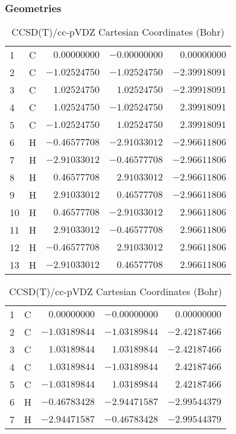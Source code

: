 \documentclass[10pt,oneside]{article}
\begin{document}
\begin{table}[h!]
\subsubsection*{Geometries}
\begin{multicols}{2}
\centering
\caption{CCSD(T)/cc-pVTZ Cartesian Coordinates (Bohr)}
\begin{tabular}{llrrr}
\toprule
1  & C  & $ 0.00000000$ & $-0.00000000$ & $ 0.00000000$ \\
2  & C  & $-1.02524750$ & $-1.02524750$ & $-2.39918091$ \\
3  & C  & $ 1.02524750$ & $ 1.02524750$ & $-2.39918091$ \\
4  & C  & $ 1.02524750$ & $-1.02524750$ & $ 2.39918091$ \\
5  & C  & $-1.02524750$ & $ 1.02524750$ & $ 2.39918091$ \\
6  & H  & $-0.46577708$ & $-2.91033012$ & $-2.96611806$ \\
7  & H  & $-2.91033012$ & $-0.46577708$ & $-2.96611806$ \\
8  & H  & $ 0.46577708$ & $ 2.91033012$ & $-2.96611806$ \\
9  & H  & $ 2.91033012$ & $ 0.46577708$ & $-2.96611806$ \\
10 & H  & $ 0.46577708$ & $-2.91033012$ & $ 2.96611806$ \\
11 & H  & $ 2.91033012$ & $-0.46577708$ & $ 2.96611806$ \\
12 & H  & $-0.46577708$ & $ 2.91033012$ & $ 2.96611806$ \\
13 & H  & $-2.91033012$ & $ 0.46577708$ & $ 2.96611806$ \\
\bottomrule
\end{tabular}
\caption{CCSD(T)/cc-pVDZ Cartesian Coordinates (Bohr)}
\begin{tabular}{llrrr}
\toprule
1  & C  & $ 0.00000000$ & $-0.00000000$ & $ 0.00000000$ \\
2  & C  & $-1.03189844$ & $-1.03189844$ & $-2.42187466$ \\
3  & C  & $ 1.03189844$ & $ 1.03189844$ & $-2.42187466$ \\
4  & C  & $ 1.03189844$ & $-1.03189844$ & $ 2.42187466$ \\
5  & C  & $-1.03189844$ & $ 1.03189844$ & $ 2.42187466$ \\
6  & H  & $-0.46783428$ & $-2.94471587$ & $-2.99544379$ \\
7  & H  & $-2.94471587$ & $-0.46783428$ & $-2.99544379$ \\

\end{tabular}
\end{multicols}
\end{table}
\end{document}
